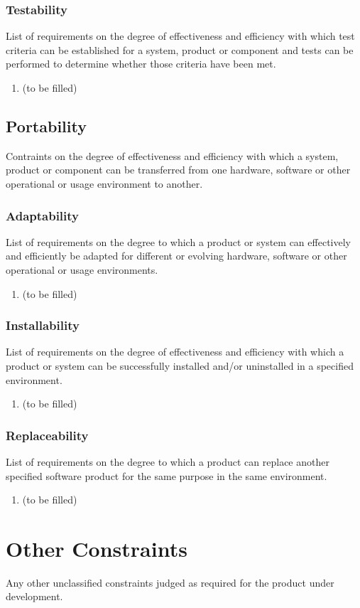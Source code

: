 \subsubsection{Testability}
List of requirements on the degree of effectiveness and efficiency with which test criteria can be established for a system, product or component and tests can be performed to determine whether those criteria have been met.
\begin{enumerate}
\item (to be filled)
\end{enumerate}


\subsection{Portability}
Contraints on the degree of effectiveness and efficiency with which a system, product or component can be transferred from one hardware, software or other operational or usage environment to another.
\subsubsection{Adaptability}
List of requirements on the degree to which a product or system can effectively and efficiently be adapted for different  or  evolving hardware, software or other operational or usage environments.
\begin{enumerate}
\item (to be filled)
\end{enumerate}
\subsubsection{Installability}
List of requirements on the degree of effectiveness and efficiency with which a product or system can be successfully installed and/or uninstalled in a specified environment.
\begin{enumerate}
\item (to be filled)
\end{enumerate}
\subsubsection{Replaceability}
List of requirements on the degree to which a product can replace another specified software product for the same purpose in the same environment.
\begin{enumerate}
\item (to be filled)
\end{enumerate}



\section{Other Constraints}
Any other unclassified constraints judged as required for the product under development.

